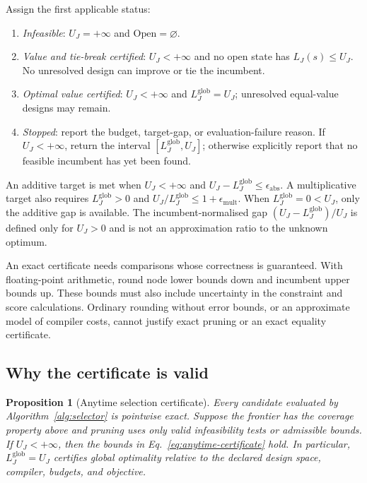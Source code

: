 \documentclass[a4paper,onecolumn,11pt,unpublished]{quantumarticle}
\newtheorem{proposition}[proposition]{Proposition}
\theoremstyle{remark}
\begin{document}
Assign the first applicable status:
\begin{enumerate}
\item \emph{Infeasible}: $U_J=+\infty$ and $\mathrm{Open}=\varnothing$.
\item \emph{Value and tie-break certified}: $U_J<+\infty$ and no open state
has $L_J(s)\leq U_J$.  No unresolved design can improve or tie the incumbent.
\item \emph{Optimal value certified}: $U_J<+\infty$ and
$L_J^{\mathrm{glob}}=U_J$; unresolved equal-value designs may remain.
\item \begin{minipage}[t]{\linewidth}\emph{Stopped}: report the budget, target-gap, or evaluation-failure
reason.  If $U_J<+\infty$, return the interval
$[L_J^{\mathrm{glob}},U_J]$; otherwise explicitly report that no feasible
incumbent has yet been found.\end{minipage}
\end{enumerate}
An additive target is met when $U_J<+\infty$ and
$U_J-L_J^{\mathrm{glob}}\leq\epsilon_{\mathrm{abs}}$.
A multiplicative target also requires $L_J^{\mathrm{glob}}>0$ and
$U_J/L_J^{\mathrm{glob}}\leq1+\epsilon_{\mathrm{mult}}$.
When $L_J^{\mathrm{glob}}=0<U_J$, only the additive gap is available.
The incumbent-normalised gap $(U_J-L_J^{\mathrm{glob}})/U_J$ is defined only
for $U_J>0$ and is not an approximation ratio to the unknown optimum.

An exact certificate needs comparisons whose correctness is guaranteed.
With floating-point arithmetic, round node lower bounds down and incumbent
upper bounds up. These bounds must also include uncertainty in the
constraint and score calculations. Ordinary rounding without error bounds,
or an approximate model of compiler costs, cannot justify exact pruning or
an exact equality certificate.

\subsection{Why the certificate is valid}
\label{app:anytime-certificate-proof}

\begin{proposition}[Anytime selection certificate]
\label{prop:anytime-certificate}
Every candidate evaluated by Algorithm~\ref{alg:selector} is pointwise exact.
Suppose the frontier has the coverage property above and pruning uses only
valid infeasibility tests or admissible bounds.  If \(U_J<+\infty\), then
the bounds in Eq.~\eqref{eq:anytime-certificate} hold.
In particular, \(L_J^{\mathrm{glob}}=U_J\) certifies global optimality
relative to the declared design space, compiler, budgets, and objective.
\end{proposition}
\end{document}
